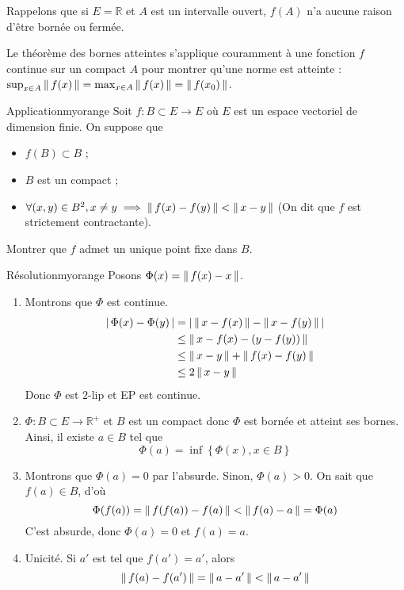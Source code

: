     Rappelons que si $E = \mathbb{R}$ et $A$ est un intervalle ouvert, $f(A)$ n’a aucune raison d’être bornée ou fermée.

    Le théorème des bornes atteintes s’applique couramment à une fonction $f$ continue sur un compact $A$ pour montrer qu’une norme est atteinte : $\sup_{x \in A} \left\lVert \,f(x) \, \right\rVert = \max_{x \in A} \left\lVert \,f(x) \, \right\rVert = \left\lVert \,f(x_0) \, \right\rVert$.

    \begin{omed}{Application}{myorange}
        Soit $f : B \subset E \to E$ où $E$ est un espace vectoriel de dimension finie. On suppose que 
        \begin{itemize}
            \item $f(B) \subset B$ ;
            \item $B$ est un compact ;
            \item $\forall (x,y) \in B^2, x \neq y \implies \left\lVert \,f(x) - f(y) \, \right\rVert < \left\lVert \,x-y \, \right\rVert$ (On dit que $f$ est strictement contractante).
        \end{itemize}
        Montrer que $f$ admet un unique point fixe dans $B$.  
    \end{omed}

    \begin{demo}{Résolution}{myorange}
        Posons $\Phi(x) = \left\lVert \,f(x) - x \, \right\rVert$. 
        \begin{enumerate}
            \item Montrons que $\Phi$ est continue. 
            \begin{align*}
                \left\lvert \,\Phi(x) - \Phi(y) \, \right\rvert 
                &= \left\lvert \,\left\lVert \,x - f(x) \, \right\rVert - \left\lVert \,x - f(y) \, \right\rVert \, \right\rvert \\
                &\leq \left\lVert \,x - f(x) - (y - f(y)) \, \right\rVert \\
                &\leq \left\lVert \,x-y \, \right\rVert + \left\lVert \,f(x) - f(y) \, \right\rVert \\
                &\leq 2 \left\lVert \,x-y \, \right\rVert
            \end{align*}
            Donc $\Phi$ est $2$-lip et EP est continue.
            \item $\Phi : B \subset E \to \mathbb{R}^+$ et $B$ est un compact donc $\Phi$ est bornée et atteint ses bornes.  Ainsi, il existe $a \in B$ tel que 
            \[ \Phi(a) = \inf\left\{\Phi(x), x \in B\right\} \]    
            \item Montrons que $\Phi(a) = 0$ par l’absurde. Sinon, $\Phi(a) > 0$. On sait que $f(a) \in B$, d’où 
            \[ \Phi(f(a)) = \left\lVert \,f(f(a)) - f(a) \, \right\rVert < \left\lVert \,f(a) - a \, \right\rVert = \Phi(a) \]   
            C’est absurde, donc $\Phi(a) = 0$ et $f(a) = a$. 
            \item Unicité. Si $a'$ est tel que $f(a') = a'$, alors
            \[ \left\lVert \,f(a) - f(a') \, \right\rVert = \left\lVert \,a - a' \, \right\rVert < \left\lVert \,a - a' \, \right\rVert \] 
        \end{enumerate}
    \end{demo}

